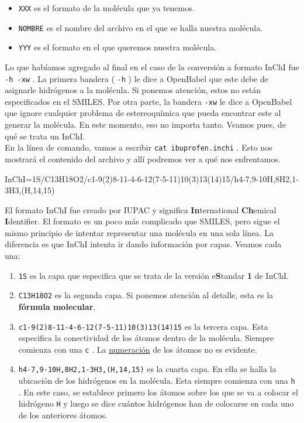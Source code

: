 \documentclass[10pt,letterpaper]{article}
\newcommand{\inlinecode}[1]{
\colorbox{light-gray}{\texttt{#1}}
}
\newenvironment{Code}
{
\begin{lrbox}{\selvestebox}%
\begin{minipage}{\dimexpr\columnwidth-2\fboxsep\relax}
\fontfamily{\ttdefault}\selectfont
}
{\end{minipage}\end{lrbox}%
\begin{center}
\colorbox{light-gray}{\usebox{\selvestebox}}
\end{center}
}
\begin{document}
\begin{itemize}
\item \inlinecode{XXX} es el formato de la mol\'ecula que ya tenemos.
\item \inlinecode{NOMBRE} es el nombre del archivo en el que se halla nuestra mol\'ecula.
\item \inlinecode{YYY} es el formato en el que queremos nuestra mol\'ecula.
\end{itemize}

Lo que hab\'iamos agregado al final en el caso de la conversi\'on a formato InChI fue \inlinecode{-h -xw}. La primera bandera (\inlinecode{-h}) le dice a OpenBabel que este debe de asignarle hidr\'ogenos a la mol\'ecula. Si ponemos atenci\'on, estos no est\'an especificados en el SMILES. Por otra parte, la bandera \inlinecode{-xw} le dice a OpenBabel que ignore cualquier problema de estereoqu\'imica que pueda encontrar este al generar la mol\'ecula. En este momento, eso no importa tanto. Veamos pues, de qu\'e se trata un InChI.\\

En la l\'inea de comando, vamos a escribir \inlinecode{cat ibuprofen.inchi}. Esto nos mostrar\'a el contenido del archivo y all\'i podremos ver a qu\'e nos enfrentamos.

\begin{Code}
InChI=1S/C13H18O2/c1-9(2)8-11-4-6-12(7-5-11)10(3)13(14)15/h4-7,9-10H,8H2,1-3H3,(H,14,15)
\end{Code}

El formato InChI fue creado por IUPAC y significa \textbf{In}ternational \textbf{Ch}emical \textbf{I}dentifier. El formato es un poco m\'as complicado que SMILES, pero sigue el mismo principio de intentar representar una mol\'ecula en una sola l\'inea. La diferencia es que InChI intenta ir dando informaci\'on por capas. Veamos cada una:

\begin{enumerate}
\item \inlinecode{1S} es la capa que especifica que se trata de la versi\'on e\textbf{S}tandar \textbf{1} de InChI.
\item \inlinecode{C13H18O2} es la segunda capa. Si ponemos atenci\'on al detalle, esta es la \textbf{f\'ormula molecular}.
\item \inlinecode{c1-9(2)8-11-4-6-12(7-5-11)10(3)13(14)15} es la tercera capa. Esta especifica la conectividad de los \'atomos dentro de la mol\'ecula. Siempre comienza con una \inlinecode{c}. La \href{http://www.inchi-trust.org/technical-faq/#11.2}{numeraci\'on} de los \'atomos no es evidente.
\item \inlinecode{h4-7,9-10H,8H2,1-3H3,(H,14,15)} es la cuarta capa. En ella se halla la ubicaci\'on de los hidr\'ogenos en la mol\'ecula. Esta siempre comienza con una \inlinecode{h}. En este caso, se establece primero los \'atomos sobre los que se va a colocar el hidr\'ogeno \inlinecode{H} y luego se dice cu\'antos hidr\'ogenos han de colocarse en cada uno de los anteriores \'atomos.
\end{enumerate}
\end{document}
